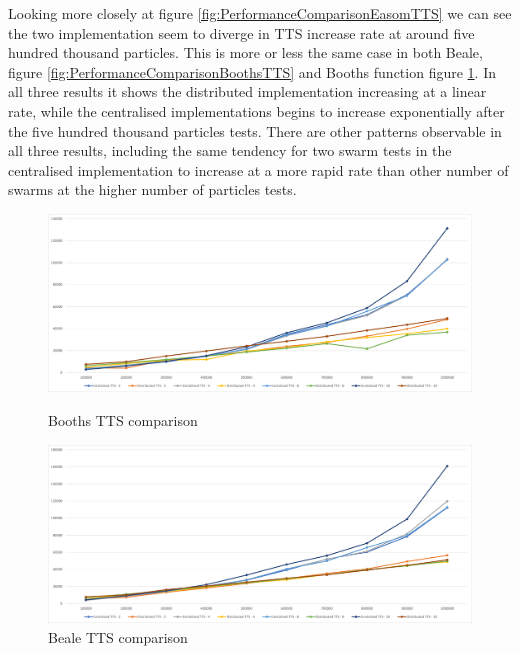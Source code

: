 \documentclass[oneside,12pt]{book}
\begin{document}
Looking more closely at figure \ref{fig:PerformanceComparisonEasomTTS} we can see the two implementation seem to diverge in TTS increase rate at around five hundred thousand particles. This is more or less the same case in both Beale, figure \ref{fig:PerformanceComparisonBoothsTTS} and Booths function figure \ref{fig:PerformanceComparisonBealeTTS}. In all three results it shows the distributed implementation increasing at a linear rate, while the centralised implementations begins to increase exponentially after the five hundred thousand particles tests. There are other patterns observable in all three results, including the same tendency for two swarm tests in the centralised implementation to increase at a more rapid rate than other number of swarms at the higher number of particles tests. 

\begin{figure}[H]
  \centering
  \begin{minipage}[b]{0.48\textwidth}
    \includegraphics[width=\textwidth]{Images/Graphs/PerformanceComparisonBoothsTTS.png}
    \caption{Booths TTS comparison}
    \label{fig:PerformanceComparisonBoothsTTS}
  \end{minipage}
  \hfill
  \begin{minipage}[b]{0.48\textwidth}
    \includegraphics[width=\textwidth]{Images/Graphs/PerformanceComparisonBealeTTS.png}
    \caption{Beale TTS comparison}
    \label{fig:PerformanceComparisonBealeTTS}
  \end{minipage}
\end{figure}
\end{document}
